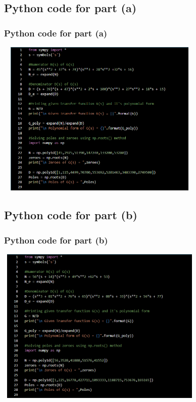 \documentclass{beamer}
\theoremstyle{remark}
\begin{document}
\subsection{Python code for part (a)}
\begin{frame}
\frametitle{Python code for part (a)}
\usepackage{}
\includegraphics[width=10cm,height=7.5cm]{Assignment 1/15_a.png}
\end{frame}









\subsection{Python code for part (b)}
\begin{frame}
\frametitle{Python code for part (b)}
\usepackage{}
\includegraphics[width=10cm,height=7.5cm]{Assignment 1/15_b.png}

\end{frame}
\end{document}
